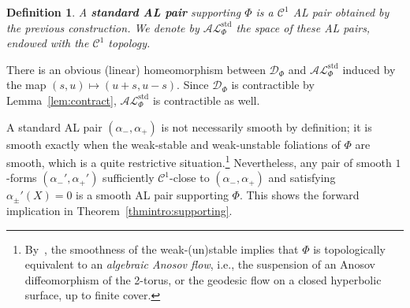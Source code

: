 \documentclass[letterpaper, 11pt]{article}
\numberwithin{equation}{section}
\newtheorem{defn}[thm]{Definition}
\begin{document}
\begin{defn} A \textbf{standard AL pair} supporting $\Phi$ is a $\mathcal{C}^1$ AL pair obtained by the previous construction. We denote by $\mathcal{AL}^\mathrm{std}_\Phi$ the space of these AL pairs, endowed with the $\mathcal{C}^1$ topology.
\end{defn}

There is an obvious (linear) homeomorphism between $\mathcal{D}_\Phi$ and $\mathcal{AL}^\mathrm{std}_\Phi$ induced by the map $(s,u) \mapsto (u+s, u-s)$. Since $\mathcal{D}_\Phi$ is contractible by Lemma~\ref{lem:contract}, $\mathcal{AL}^\mathrm{std}_\Phi$ is contractible as well.

A standard AL pair $(\alpha_-, \alpha_+)$ is not necessarily smooth by definition; it is smooth exactly when the weak-stable and weak-unstable foliations of $\Phi$ are smooth, which is a quite restrictive situation.\footnote{By~\cite[Theorem 4.7]{Gh93}, the smoothness of the weak-(un)stable implies that $\Phi$ is topologically equivalent to an \emph{algebraic Anosov flow}, i.e., the suspension of an Anosov diffeomorphism of the 2-torus, or the geodesic flow on a closed hyperbolic surface, up to finite cover.} Nevertheless, any pair of smooth $1$-forms $(\alpha_-', \alpha_+')$ sufficiently $\mathcal{C}^1$-close to $(\alpha_-, \alpha_+)$ and satisfying $\alpha_\pm'(X) = 0$ is a smooth AL pair supporting $\Phi$. This shows the forward implication in Theorem~\ref{thmintro:supporting}.
\end{document}
